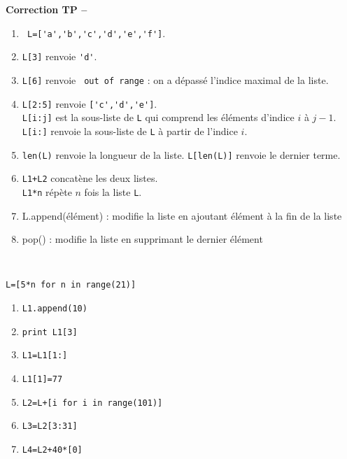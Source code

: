 \ifdef{\public}{}{}

\newpage 

\begin{center}
{\Large\bf Correction TP \no {\numero} -- \descrip}
\end{center}



\begin{solution}
\begin{enumerate}
\item \verb? L=['a','b','c','d','e','f']?.
\item \verb?L[3]? renvoie \verb?'d'?.
\item \verb?L[6]? renvoie \verb? out of range? : on a dépassé l'indice maximal de la liste.
\item \verb?L[2:5]? renvoie \verb?['c','d','e']?. \\
\verb?L[i:j]? est la sous-liste de \verb?L? qui comprend les éléments d'indice $i$ à $j-1$. \\
\verb?L[i:]? renvoie la sous-liste de \verb?L? à partir de l'indice $i$.
\item \verb?len(L)? renvoie la longueur de la liste. \verb?L[len(L)]? renvoie le dernier terme.
\item \verb?L1+L2? concatène les deux listes.\\
\verb?L1*n? répète $n$ fois la liste \verb?L?.
\item L.append(élément) : modifie la liste en ajoutant élément à la fin de la liste
\item pop() : modifie la liste en supprimant le dernier élément
\end{enumerate}
\end{solution}


\begin{solution}~\\
\vspace{-0.7cm}
\begin{verbatim}
L=[5*n for n in range(21)]
\end{verbatim}
\end{solution}


\begin{solution}
\begin{enumerate}
\item \verb?L1.append(10)?
\item \verb?print L1[3]?
\item \verb?L1=L1[1:]?
\item \verb?L1[1]=77?
\item \verb?L2=L+[i for i in range(101)]?
\item \verb?L3=L2[3:31]?
\item \verb?L4=L2+40*[0]?
\end{enumerate}
\end{solution}



